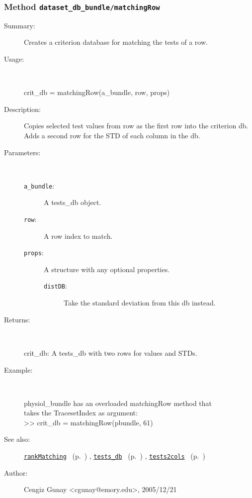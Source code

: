 \subsubsection[Method \texttt{matchingRow}]{Method \texttt{dataset\_db\_bundle/matchingRow}}%
%
\label{ref_dataset_db_bundle__matchingRow}%
\hypertarget{ref_dataset_db_bundle__matchingRow}{}%
\begin{description}
\item[Summary:]Creates a criterion database for matching the tests of a row.
%
\item[Usage:]~%
\begin{lyxcode}%
crit\_db = matchingRow(a\_bundle, row, props)
%
\end{lyxcode}%
%
\item[Description:]%
Copies selected test values from row as the first row into the 
 criterion db. Adds a second row for the STD of each column in the db.
\item[Parameters:]~
\begin{description}%
\item[\texttt{a\_bundle}:]
 A tests\_db object.
\item[\texttt{row}:]
 A row index to match.
\item[\texttt{props}:]
 A structure with any optional properties.
\begin{description}%
\item[\texttt{distDB}:]
 Take the standard deviation from this db instead.
\end{description}%
\end{description}%
%
\item[Returns:
]~

	crit\_db: A tests\_db with two rows for values and STDs.
%
\item[Example:]~
\begin{lyxcode}        physiol\_bundle has an overloaded matchingRow method that
\\%
        takes the TracesetIndex as argument:
\\%
        >> crit\_db = matchingRow(pbundle, 61)
\\%
\end{lyxcode}
%
\item[See also:]%
\hyperlink{ref_rankMatching}{\texttt{rankMatching}}%
\ (p.~\pageref{ref_rankMatching})%
%
, \hyperlink{ref_tests_db}{\texttt{tests\_db}}%
\ (p.~\pageref{ref_tests_db})%
%
, \hyperlink{ref_tests2cols}{\texttt{tests2cols}}%
\ (p.~\pageref{ref_tests2cols})%
%
%
\item[Author:]%
Cengiz Gunay <cgunay@emory.edu>, 2005/12/21
%
\end{description}
\methodline%
